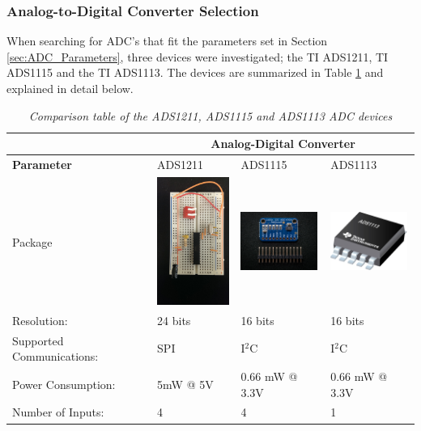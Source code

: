 \subsubsection{Analog-to-Digital Converter Selection}
\indent When searching for ADC's that fit the parameters set in Section \ref{sec:ADC_Parameters}, three devices were investigated; the TI ADS1211, TI
ADS1115 and the TI ADS1113. The devices are summarized in Table \ref{tab:ADC_Compare} and explained in detail below.

\begin{table}[H]
\begin{center}
\begin{tabular}{|p{3cm}| p{3cm} | p{3cm} | p{3cm}|}
\hline
&\multicolumn{3}{c|}{\textbf{Analog-Digital Converter}}\\
\hline
\textbf{Parameter} & ADS1211 & ADS1115 & ADS1113\\
\hline
Package &\includegraphics[width = 2.5cm]{KIRBY_Images/oldadc}
&
\includegraphics[width = 2.5cm]{KIRBY_Images/ads1115} & \includegraphics[width = 2.5cm]{KIRBY_Images/ADS1113_msop10}\\
\hline
Resolution: & 24 bits & 16 bits & 16 bits\\
\hline
Supported Communications:&	 SPI & I$^2$C & I$^2$C \\
\hline
Power Consumption:&	5mW @ 5V	& 0.66 mW @ 3.3V & 0.66 mW @ 3.3V\\
\hline
Number of Inputs: & 4 & 4 & 1\\
\hline

\end{tabular}
\caption{\textit{Comparison table of the ADS1211, ADS1115 and ADS1113 ADC devices}}
\label{tab:ADC_Compare}
\end{center}
\end{table}


